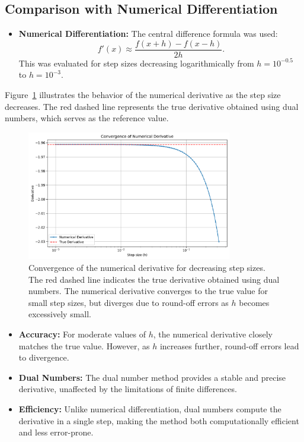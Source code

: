 \documentclass[a4paper,12pt]{article}
\begin{document}
\subsection{Comparison with Numerical Differentiation}

\begin{itemize}
    \item \textbf{Numerical Differentiation:} The central difference formula was used:
    \[
    f'(x) \approx \frac{f(x + h) - f(x - h)}{2h}.
    \]
    This was evaluated for step sizes decreasing logarithmically from \(h = 10^{-0.5}\) to \(h = 10^{-3}\).
\end{itemize}

Figure~\ref{fig:convergence_derivative} illustrates the behavior of the numerical derivative as the step size decreases. The red dashed line represents the true derivative obtained using dual numbers, which serves as the reference value.

\begin{figure}[h!]
    \centering
    \includegraphics[width=0.8\textwidth]{convergence_derivative.png}
    \caption{Convergence of the numerical derivative for decreasing step sizes. The red dashed line indicates the true derivative obtained using dual numbers. The numerical derivative converges to the true value for small step sizes, but diverges due to round-off errors as \(h\) becomes excessively small.}
    \label{fig:convergence_derivative}
\end{figure}

\begin{itemize}
    \item \textbf{Accuracy:} For moderate values of \(h\), the numerical derivative closely matches the true value. However, as \(h\) increases further, round-off errors lead to divergence.
    \item \textbf{Dual Numbers:} The dual number method provides a stable and precise derivative, unaffected by the limitations of finite differences.
    \item \textbf{Efficiency:} Unlike numerical differentiation, dual numbers compute the derivative in a single step, making the method both computationally efficient and less error-prone.
\end{itemize}
\end{document}
